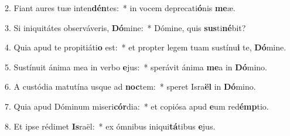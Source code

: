 2. Fiant aures tuæ inten\textbf{dén}tes:~*  in vocem deprecati\textbf{ó}nis \textbf{me}æ.\

3. Si iniquitátes observáveris, \textbf{Dó}mine:~*  Dómine, quis \textbf{sus}ti\textbf{né}bit?\

4. Quia apud te propitiáti\textbf{o} est:~*  et propter legem tuam sustínu\textbf{i} te, \textbf{Dó}mine.\

5. Sustínuit ánima mea in verbo \textbf{e}jus:~*  sperávit ánima \textbf{me}a in \textbf{Dó}mino.\

6. A custódia matutína usque ad \textbf{noc}tem:~*  speret Isra\textbf{ël} in \textbf{Dó}mino.\

7. Quia apud Dóminum miseri\textbf{cór}dia:~*  et copiósa apud \textbf{e}um red\textbf{émp}tio.\

8. Et ipse rédimet \textbf{Is}raël:~*  ex ómnibus iniqui\textbf{tá}tibus \textbf{e}jus.\

